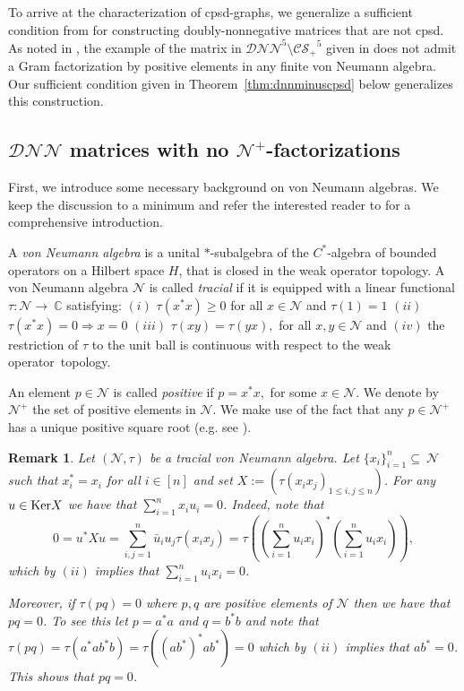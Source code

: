 \documentclass{siamart}
\newtheorem{remark}{Remark}[section]
\begin{document}
{To arrive at the characterization of cpsd-graphs, we generalize a sufficient condition from \cite{FW} for constructing doubly-nonnegative matrices that are not
cpsd.  As noted in \cite{LP14}, the example of the matrix  in  ${\mathcal{DNN}}^5\setminus {\mathcal{CS}_+}^5$ given in \cite{FW} does not admit a Gram factorization  by  positive elements in any finite  von Neumann algebra.  Our   sufficient condition given in Theorem~\ref{thm:dnnminuscpsd} below  generalizes this construction.}

\subsection{${\mathcal{DNN}}$ matrices with no  $\mathcal{N}^+$-factorizations}\label{thm:neccondition1}

First, we introduce    some necessary
background   on  von Neumann algebras. We  keep the discussion to a minimum and
 {refer the} interested reader to \cite{Murphy} for a
comprehensive introduction.

A {\em von Neumann algebra}  is a unital  $\ast$-subalgebra of the $C^\ast$-algebra  of bounded operators on a Hilbert space $H$,  that is closed in the weak operator topology.
A von Neumann algebra $\mathcal{N}$  is called {\em tracial}  if it is equipped with
 a linear functional  $\tau: \mathcal{N}\rightarrow~{\mathbb{C}}$  satisfying:  $(i)$ $\tau(x^*x)\ge0$ for all $x\in \mathcal{N}$ and $\tau(1)=1$ $ (ii)$ $\tau(x^*x)=0\Longrightarrow x=0$ $(iii)$ $\tau(xy)=
\tau(yx),$ for all $x,y\in \mathcal{N}$ and $(iv)$ the restriction of $\tau$ to the unit ball is continuous with respect to the weak operator~topology.

An element $p\in \mathcal{N}$ {is} called {\em positive} if $p=x^\ast x,
$ for some $x\in \mathcal{N}$.   We denote by $\mathcal{N}^+$ the set
of positive elements in $\mathcal{N}$. We  make use of  the  fact
that any  $p\in \mathcal{N}^+$ has  a unique positive  square root
(e.g. see  \cite[Theorem 2.2.1]{Murphy}).

\medskip
\begin{remark}\label{rem:kernelvectorvn}Let $(\mathcal{N},\tau)$ be a tracial  von Neumann algebra.
 Let   $\{x_i\}_{i=1}^n\subseteq~\mathcal{N}$ such that $x_i^\ast=x_i$ for all $i\in [n]$ and set    $X:=(\tau(x_ix_j)_{1\le i,j\le n})$. For any  $u\in {\rm Ker} X$ we have  that $\sum_{i=1}^nx_i u_i=0$. Indeed, note that
\[ 0=u^\ast Xu=\sum_{i,j=1}^n\bar{u}_iu_j\tau(x_ix_j)=\tau {\left( \left( \sum_{i=1}^nu_ix_i \right)^\ast \left( \sum_{i=1}^nu_ix_i \right) \right)}, \]
which by $(ii)$  implies that $\sum_{i=1}^nu_ix_i=0$.

Moreover, if $\tau(pq)=0$ where $p,q$ are positive elements of $\mathcal{N}$ then we have that  $pq=0$. To see this let $p=a^\ast a$ and $q=b^\ast b$ and note that $\tau(pq)=\tau(a^\ast ab^\ast b)=\tau((ab^\ast)^\ast ab^\ast)=0$ which by $(ii)$ implies that  $ ab^\ast=0$.  This shows that $pq=0$.
\end{remark}
\medskip
\end{document}
